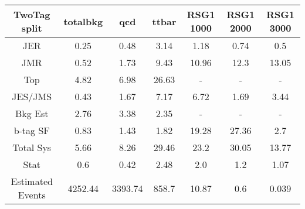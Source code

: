 \begin{footnotesize} 
\begin{tabular}{c|c|c|c|c|c|c} 
TwoTag split & totalbkg & qcd & ttbar & RSG1 1000 & RSG1 2000 & RSG1 3000 \\ 
\hline\hline 
JER & 0.25 & 0.48 & 3.14 & 1.18 & 0.74 & 0.5\\ 
JMR & 0.52 & 1.73 & 9.43 & 10.96 & 12.3 & 13.05\\ 
Top & 4.82 & 6.98 & 26.63 &  -  &  -  &  - \\ 
JES/JMS & 0.43 & 1.67 & 7.17 & 6.72 & 1.69 & 3.44\\ 
Bkg Est & 2.76 & 3.38 & 2.35 &  -  &  -  &  - \\ 
b-tag SF & 0.83 & 1.43 & 1.82 & 19.28 & 27.36 & 2.7\\ 
\hline 
Total Sys & 5.66 & 8.26 & 29.46 & 23.2 & 30.05 & 13.77\\ 
\hline 
Stat & 0.6 & 0.42 & 2.48 & 2.0 & 1.2 & 1.07\\ 
\hline 
Estimated Events & 4252.44 & 3393.74 & 858.7 & 10.87 & 0.6 & 0.039\\ 
\hline\hline 
\end{tabular} 
\end{footnotesize} 
\newline 

